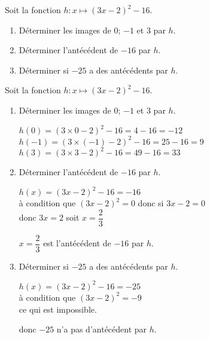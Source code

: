 \begin{exercice}
    Soit la fonction $h:x\longmapsto (3x-2)^2-16$.
    \begin{enumerate} 
        \item Déterminer les images de $0$; $-1$ et $3$ par $h$.
        \item Déterminer l'antécédent de $-16$ par $h$.
        \item Déterminer si $-25$ a des antécédents par $h$.
    \end{enumerate}
\end{exercice}
\begin{corrige}
    Soit la fonction $h:x\longmapsto (3x-2)^2-16$.

    \begin{enumerate} 
        \item Déterminer les images de $0$; $-1$ et $3$ par $h$.
        
        {\red $h(0)=(3\times 0 -2)^2-16=4-16=-12$\\}
        {\red $h(-1)=(3\times(-1) -2)^2-16=25-16=9$\\}
        {\red $h(3)=(3\times 3 -2)^2-16=49-16=33$}
        \item Déterminer l'antécédent de $-16$ par $h$.
        
        {\red $h(x)=(3x-2)^2-16=-16$\\ à condition que $(3x-2)^2=0$ donc si $3x-2=0$\\ donc $3x=2$ soit $x=\dfrac{2}{3}$
        
        $x=\dfrac{2}{3}$ est l'antécédent de $-16$ par $h$.
        }
        \smallskip
        \item Déterminer si $-25$ a des antécédents par $h$.
        
        {\red $h(x)=(3x-2)^2-16=-25$\\ à condition que $(3x-2)^2=-9$\\ ce qui est impossible.
        
        donc $-25$ n'a pas d'antécédent par $h$.
        }
    \end{enumerate}
\end{corrige}
